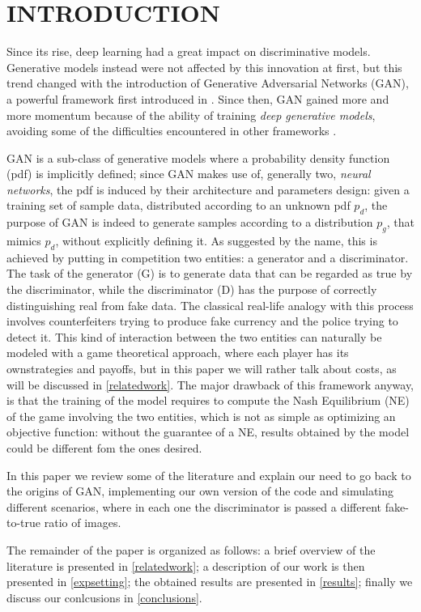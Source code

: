 \section{INTRODUCTION} \label{intro}

Since its rise, deep learning had a great impact on discriminative models. Generative models instead were not affected by this innovation at first, but this trend changed with the introduction of Generative Adversarial Networks (GAN), a powerful framework first introduced in \cite{NIPS2014_5423}. Since then, GAN gained more and more momentum because of the ability of training \textit{deep generative models}, avoiding some of the difficulties encountered in other frameworks \cite{DBLP:journals/corr/Goodfellow17}.

GAN is a sub-class of generative models where a probability density function (pdf) is implicitly defined; since GAN makes use of, generally two, \textit{neural networks}, the pdf is induced by their architecture and parameters design: given a training set of sample data, distributed according to an unknown pdf $p_d$, the purpose of GAN is indeed to generate samples according to a distribution $p_g$, that mimics $p_d$, without explicitly defining it.
As suggested by the name, this is achieved by putting in competition two entities: a generator and a discriminator. The task of the generator (G) is to generate data that can be regarded as true by the discriminator, while the discriminator (D) has the purpose of correctly distinguishing real from fake data. The classical real-life analogy with this process involves counterfeiters trying to produce fake currency and the police trying to detect it.
This kind of interaction between the two entities can naturally be modeled with a game theoretical approach, where each player has its ownstrategies and payoffs, but in this paper we will rather talk about costs, as will be discussed in \ref{relatedwork}. The major drawback of this framework anyway, is that the training of the model requires to compute the Nash Equilibrium (NE) of the game involving the two entities, which is not as simple as optimizing an objective function: without the guarantee of a NE, results obtained by the model could be different fom the ones desired.

In this paper we review some of the literature and explain our need to go back to the origins of GAN, implementing our own version of the code and simulating different scenarios, where in each one the discriminator is passed a different fake-to-true ratio of images.

The remainder of the paper is organized as follows: a brief overview of the literature is presented in \ref{relatedwork}; a description of our work is then presented in \ref{expsetting}; the obtained results are presented in \ref{results}; finally we discuss our conlcusions in \ref{conclusions}.
